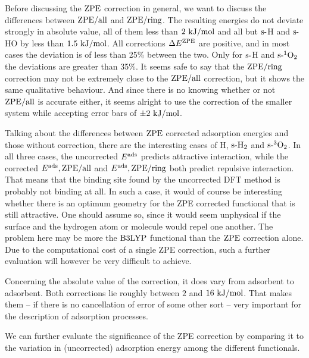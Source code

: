 \documentclass[8.5pt,twoside,twocolumn]{article}
\newcommand\zpe{\enmat{\te{ZPE}}}
\newcommand\eads{\enmat{E^{\te{ads}}}}
\newcommand\sur{\enmat{\te{s-}}}
\newcommand\kmo{\enmat{\te {kJ/mol}}}
\theoremstyle{standard}
\begin{document}
Before discussing the $\zpe$ correction in general, we want to discuss
the differences between $\zpeall$ and $\zpering$. The resulting energies
do not deviate strongly in absolute value, all of them less than $2~\kmo$
and all but $\sur$H and $\sur$HO by less than $1.5~\kmo$. All corrections $\Dl E^\zpe$ are
positive, and in most cases the deviation is of less than 25\% between
the two. Only for $\sur$H and $\sur^1\ot$ the deviations are greater than 35\%.
It seems safe to say that the $\zpering$ correction may not be extremely
close to the $\zpeall$ correction, but it shows the same qualitative
behaviour. And since there is no knowing whether or not $\zpeall$ is
accurate either, it seems alright to use the correction of the smaller
system while accepting error bars of $\pm 2~\kmo$.

Talking about the differences between $\zpe$ corrected adsorption energies
and those without correction, there are the interesting cases of 
\sur H, $\sur\htw$ and $\sur^3\ot$. In all three cases, the uncorrected
$\eads{}$ predicts attractive interaction, while the corrected $\eads{,\zpeall}$
and $\eads{,\zpering}$ both predict repulsive interaction. That means that
the binding site found by the uncorrected DFT method is probably not binding at all.
In such a case, it would of
course be interesting whether there is an optimum geometry for the ZPE
corrected functional that is still attractive. One should assume so,
since it would seem unphysical if the surface and the hydrogen atom
or molecule would repel one another. The problem here may be more the
$\text{B3LYP}$ functional than the $\zpe$ correction alone. Due to the computational
cost of a single ZPE correction, such a further evaluation will however be very
difficult to achieve.

Concerning the absolute value of the correction, it does vary from
adsorbent to adsorbent. Both corrections lie roughly between $2$
and $16~\kmo$. That makes them -- if there is no cancellation
of error of some other sort -- very important for the description
of adsorption processes.

We can further evaluate the significance of the ZPE correction by comparing
it to the variation in (uncorrected) adsorption energy among 
the different functionals.
\end{document}
